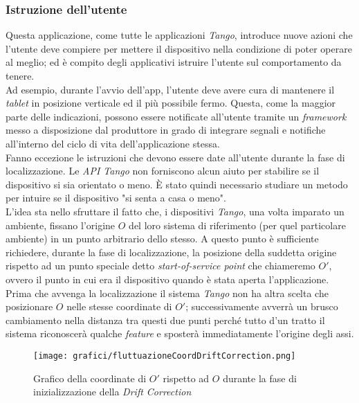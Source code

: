 \subsubsection{Istruzione dell'utente}
Questa applicazione, come tutte le applicazioni \emph{Tango}, introduce nuove azioni che l'utente deve compiere per mettere il dispositivo nella condizione di poter operare al meglio; ed è compito degli applicativi istruire l'utente sul comportamento da tenere.\\
Ad esempio, durante l'avvio dell'app, l'utente deve avere cura di mantenere il \emph{tablet} in posizione verticale ed il più possibile fermo. Questa, come la maggior parte delle indicazioni, possono essere notificate all'utente tramite un \emph{framework} messo a disposizione dal produttore in grado di integrare segnali e notifiche all'interno del ciclo di vita dell'applicazione stessa.\\
Fanno eccezione le istruzioni che devono essere date all'utente durante la fase di localizzazione. Le \emph{API Tango} non forniscono alcun aiuto per stabilire se il dispositivo si sia orientato o meno. È stato quindi necessario studiare un metodo per intuire se il dispositivo "si senta a casa o meno".\\
L'idea sta nello sfruttare il fatto che, i dispositivi \emph{Tango}, una volta imparato un ambiente, fissano l'origine $O$ del loro sistema di riferimento (per quel particolare ambiente) in un punto arbitrario dello stesso. A questo punto è sufficiente richiedere, durante la fase di localizzazione, la posizione della suddetta origine rispetto ad un punto speciale detto \emph{start-of-service point} che chiameremo $O'$, ovvero il punto in cui era il dispositivo quando è stata aperta l'applicazione. Prima che avvenga la localizzazione il sistema \emph{Tango} non ha altra scelta che posizionare $O$ nelle stesse coordinate di $O'$; successivamente avverrà un brusco cambiamento nella distanza tra questi due punti perché tutto d'un tratto il sistema riconoscerà qualche \emph{feature} e sposterà immediatamente l'origine degli assi.
\begin{figure}[!h] 
    \centering 
    \texttt{[image: grafici/fluttuazioneCoordDriftCorrection.png]} 
    \caption{Grafico della coordinate di $O'$ rispetto ad $O$ durante la fase di inizializzazione della \emph{Drift Correction}}
\end{figure}







